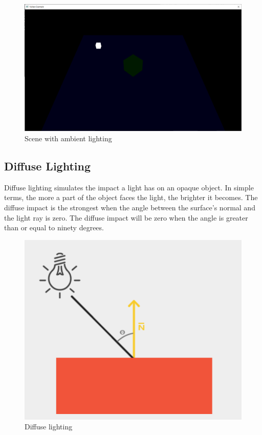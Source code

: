 \begin{figure}[H]
    \centering
    \includegraphics[scale=0.25]{images/ChBlinnPhong/SceneAmbient.png}
    \caption{Scene with ambient lighting}
    \label{fig::SceneAmbient}
\end{figure}

\subsection{Diffuse Lighting}

Diffuse lighting simulates the impact a light has on an opaque object.
In simple terms, the more a part of the object faces the light, the brighter
it becomes.
The diffuse impact is the strongest when
the angle between the surface's normal and the light ray is zero.
The diffuse impact will be zero when the angle is greater than or equal to
ninety degrees.

\begin{figure}[H]
    \centering
    \includegraphics[scale=0.40]{images/ChBlinnPhong/DiffuseLighting.png}
    \caption{Diffuse lighting}
    \label{fig::DiffuseLighting}
\end{figure}

